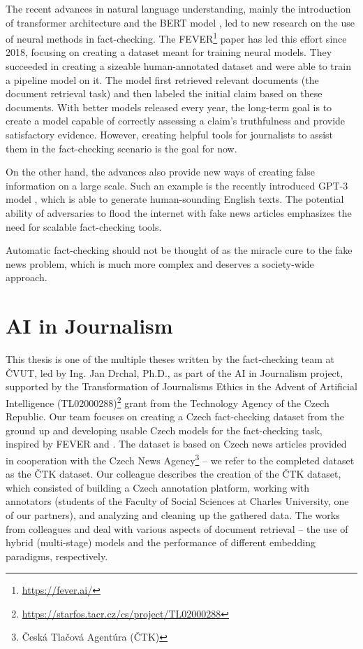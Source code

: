 The recent advances in natural language understanding, mainly the introduction of transformer architecture \citep{attention-is-all-you-need} and the BERT model \citep{bert}, led to new research on the use of neural methods in fact-checking.
The FEVER\footnote{\url{https://fever.ai/}} paper \citep{fever} has led this effort since 2018, focusing on creating a dataset meant for training neural models.
They succeeded in creating a sizeable human-annotated dataset and were able to train a pipeline model on it.
The model first retrieved relevant documents (the document retrieval task) and then labeled the initial claim based on these documents. 
With better models released every year, the long-term goal is to create a model capable of correctly assessing a claim's truthfulness and provide satisfactory evidence. However, creating helpful tools for journalists to assist them in the fact-checking scenario is the goal for now.

On the other hand, the advances also provide new ways of creating false information on a large scale. Such an example is the recently introduced GPT-3 model \citep{gpt}, which is able to generate human-sounding English texts.
The potential ability of adversaries to flood the internet with fake news articles emphasizes the need for scalable fact-checking tools.

Automatic fact-checking should not be thought of as the miracle cure to the fake news problem, which is much more complex and deserves a society-wide approach.

\section*{AI in Journalism}

This thesis is one of the multiple theses written by the fact-checking team at ČVUT, led by Ing. Jan Drchal, Ph.D., as part of the AI in Journalism project, supported by the Transformation of Journalisms Ethics in the Advent of Artificial Intelligence (TL02000288)\footnote{\url{https://starfos.tacr.cz/cs/project/TL02000288}} grant from the Technology Agency of the Czech Republic.
Our team focuses on creating a Czech fact-checking dataset from the ground up and developing usable Czech models for the fact-checking task, inspired by FEVER \citep{fever} and \citet{danish_fever}.
The dataset is based on Czech news articles provided in cooperation with the Czech News Agency\footnote{Česká Tlačová Agentúra (ČTK)} -- we refer to the completed dataset as the ČTK dataset. 
Our colleague \citet{ullrich} describes the creation of the ČTK dataset, which consisted of building a Czech annotation platform, working with annotators (students of the Faculty of Social Sciences at Charles University, one of our partners), and analyzing and cleaning up the gathered data.
The works from colleagues \citet{dedkova} and \citet{rypar} deal with various aspects of document retrieval -- the use of hybrid (multi-stage) models and the performance of different embedding paradigms, respectively.

